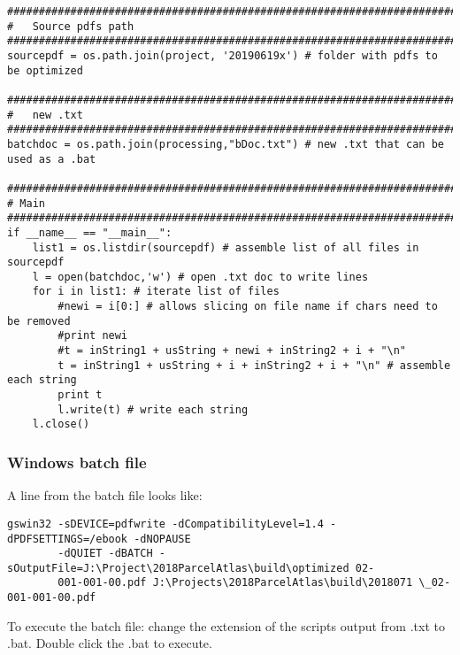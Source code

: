 {\begin{footnotesize}
\begin{verbatim}
################################################################################
#   Source pdfs path
################################################################################
sourcepdf = os.path.join(project, '20190619x') # folder with pdfs to be optimized

################################################################################
#   new .txt
################################################################################
batchdoc = os.path.join(processing,"bDoc.txt") # new .txt that can be used as a .bat

################################################################################
# Main
################################################################################
if __name__ == "__main__":
    list1 = os.listdir(sourcepdf) # assemble list of all files in sourcepdf
    l = open(batchdoc,'w') # open .txt doc to write lines
    for i in list1: # iterate list of files
        #newi = i[0:] # allows slicing on file name if chars need to be removed
        #print newi
        #t = inString1 + usString + newi + inString2 + i + "\n"
        t = inString1 + usString + i + inString2 + i + "\n" # assemble each string
        print t
        l.write(t) # write each string
    l.close()
\end{verbatim}
\end{footnotesize}}

\subsubsection{Windows batch file}
A line from the batch file looks like:
{\begin{footnotesize}\color{orange}
\begin{verbatim}
gswin32 -sDEVICE=pdfwrite -dCompatibilityLevel=1.4 -dPDFSETTINGS=/ebook -dNOPAUSE
        -dQUIET -dBATCH -sOutputFile=J:\Project\2018ParcelAtlas\build\optimized 02-
        001-001-00.pdf J:\Projects\2018ParcelAtlas\build\2018071 \_02-001-001-00.pdf
\end{verbatim}
\end{footnotesize}}

\noindent To execute the batch file: change the extension of the scripts output from .txt to .bat.  Double click the .bat to execute.





